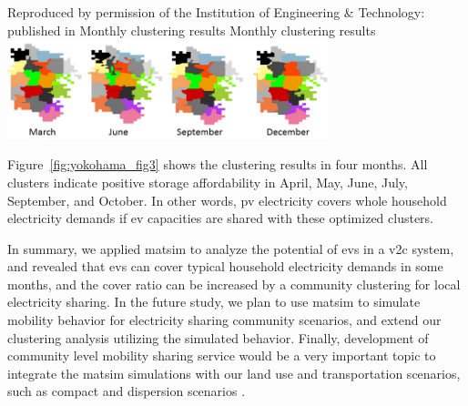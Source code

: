 {Reproduced by permission of the Institution of Engineering \& Technology: published in \citet[][Figure~10.a]{YamagataSeya_ITSIET_2015}}
%
\createfigure%
{Monthly clustering results}%
{Monthly clustering results}%
{\label{fig:yokohama_fig3}}%
{\includegraphics[width=0.7\textwidth, angle=0]{./scenarios/figures/yokohama_fig3.png}}%
{}

Figure~\ref{fig:yokohama_fig3} shows the clustering results in four months. All clusters indicate positive storage affordability in April, May, June, July, September, and October. In other words, \gls{pv} electricity covers whole household electricity demands if \gls{ev} capacities are shared with these optimized clusters.

In summary, we applied \gls{matsim} to analyze the potential of \glspl{ev} in a \gls{v2c} system, and revealed that \glspl{ev} can cover typical household electricity demands in some months, and the cover ratio can be increased by a community clustering for local electricity sharing. In the future study, we plan to use \gls{matsim} to simulate mobility behavior for electricity sharing community scenarios, and extend our clustering analysis utilizing the simulated behavior. Finally, development of community level mobility sharing service would be a very important topic to integrate the \gls{matsim} simulations with our land use and transportation scenarios, such as compact and dispersion scenarios \citep[see][]{YamagataEtAl_AoG_2013}.

